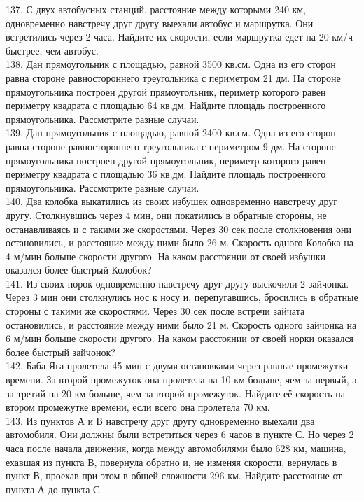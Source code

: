 \documentclass[12pt]{article}
\begin{document}
137. С двух автобусных станций, расстояние между которыми 240 км, одновременно навстречу друг другу выехали автобус и маршрутка. Они встретились через 2 часа. Найдите их скорости, если маршрутка едет на 20 км/ч быстрее, чем автобус.\\
138. Дан прямоугольник с площадью, равной 3500 кв.см. Одна из его сторон равна стороне равностороннего треугольника с периметром 21 дм. На стороне прямоугольника построен другой прямоугольник, периметр которого равен периметру квадрата с площадью 64 кв.дм. Найдите площадь построенного прямоугольника. Рассмотрите разные случаи.\\
139. Дан прямоугольник с площадью, равной 2400 кв.см. Одна из его сторон равна стороне равностороннего треугольника с периметром 9 дм. На стороне прямоугольника построен другой прямоугольник, периметр которого равен периметру квадрата с площадью 36 кв.дм. Найдите площадь построенного прямоугольника. Рассмотрите разные случаи.\\
140. Два колобка выкатились из своих избушек одновременно навстречу друг другу. Столкнувшись через 4 мин, они покатились в обратные стороны, не останавливаясь и с такими же скоростями. Через 30 сек после столкновения они остановились, и расстояние между ними было 26 м. Скорость одного Колобка на 4 м/мин больше скорости другого. На каком расстоянии от своей избушки оказался более быстрый Колобок?\\
141. Из своих норок одновременно навстречу друг другу выскочили 2 зайчонка. Через 3 мин они столкнулись нос к носу и, перепугавшись, бросились в обратные стороны с такими же скоростями. Через 30 сек после встречи зайчата остановились, и расстояние между ними было 21 м. Скорость одного зайчонка на 6 м/мин больше скорости другого. На каком расстоянии от своей норки оказался более быстрый зайчонок?\\
142. Баба-Яга пролетела 45 мин с двумя остановками через равные промежутки времени. За второй промежуток она пролетела на 10 км больше, чем за первый, а за третий на 20 км больше, чем за второй промежуток. Найдите её скорость на втором промежутке времени, если всего она пролетела 70 км.\\
143. Из пунктов А и В навстречу друг другу одновременно выехали два автомобиля. Они должны были встретиться через 6 часов в пункте С. Но через 2 часа после начала движения, когда между автомобилями было 628 км, машина, ехавшая из пункта В, повернула обратно и, не изменяя скорости, вернулась в пункт В, проехав при этом в общей сложности 296 км. Найдите расстояние от пункта А до пункта С.\\
\end{document}
